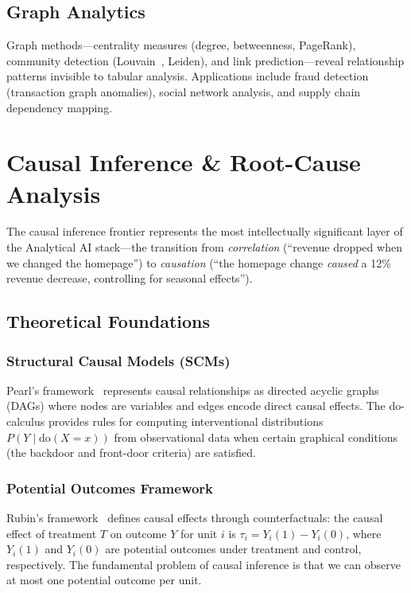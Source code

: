 \documentclass[12pt, a4paper]{article}
\begin{document}
\subsection{Graph Analytics}
Graph methods---centrality measures (degree, betweenness, PageRank), community detection (Louvain~\citep{blondel2008louvain}, Leiden), and link prediction---reveal relationship patterns invisible to tabular analysis. Applications include fraud detection (transaction graph anomalies), social network analysis, and supply chain dependency mapping.

\section{Causal Inference \& Root-Cause Analysis}\label{sec:causal}

The causal inference frontier represents the most intellectually significant layer of the Analytical AI stack---the transition from \emph{correlation} (``revenue dropped when we changed the homepage'') to \emph{causation} (``the homepage change \emph{caused} a 12\% revenue decrease, controlling for seasonal effects'').

\subsection{Theoretical Foundations}

\subsubsection{Structural Causal Models (SCMs)}
Pearl's framework~\citep{pearl2009causality} represents causal relationships as directed acyclic graphs (DAGs) where nodes are variables and edges encode direct causal effects. The do-calculus provides rules for computing interventional distributions $P(Y \mid \text{do}(X=x))$ from observational data when certain graphical conditions (the backdoor and front-door criteria) are satisfied.

\subsubsection{Potential Outcomes Framework}
Rubin's framework~\citep{rubin2005causal} defines causal effects through counterfactuals: the causal effect of treatment $T$ on outcome $Y$ for unit $i$ is $\tau_i = Y_i(1) - Y_i(0)$, where $Y_i(1)$ and $Y_i(0)$ are potential outcomes under treatment and control, respectively. The fundamental problem of causal inference is that we can observe at most one potential outcome per unit.
\end{document}

